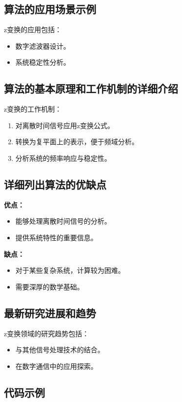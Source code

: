 \subsection*{算法的应用场景示例}
z变换的应用包括：
\begin{itemize}
    \item 数字滤波器设计。
    \item 系统稳定性分析。
\end{itemize}

\subsection*{算法的基本原理和工作机制的详细介绍}
z变换的工作机制：
\begin{enumerate}
    \item 对离散时间信号应用z变换公式。
    \item 转换为复平面上的表示，便于频域分析。
    \item 分析系统的频率响应与稳定性。
\end{enumerate}

\subsection*{详细列出算法的优缺点}
\textbf{优点：}
\begin{itemize}
    \item 能够处理离散时间信号的分析。
    \item 提供系统特性的重要信息。
\end{itemize}

\textbf{缺点：}
\begin{itemize}
    \item 对于某些复杂系统，计算较为困难。
    \item 需要深厚的数学基础。
\end{itemize}

\subsection*{最新研究进展和趋势}
z变换领域的研究趋势包括：
\begin{itemize}
    \item 与其他信号处理技术的结合。
    \item 在数字通信中的应用探索。
\end{itemize}
\subsection*{代码示例}
\begin{lstlisting}

\end{lstlisting}


